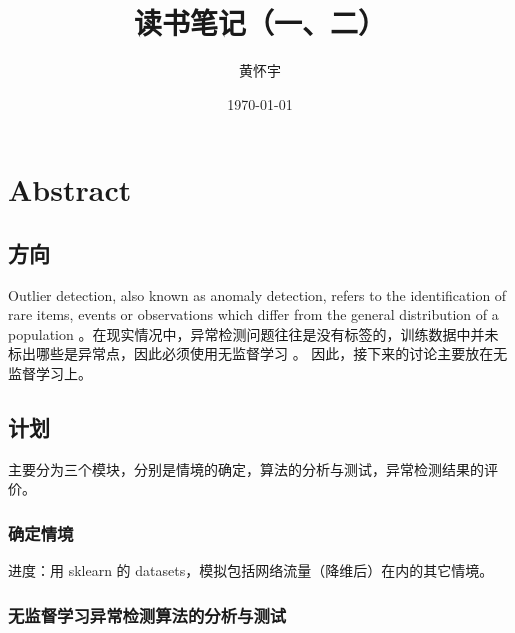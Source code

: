 \documentclass[UTF8]{ctexart}
\title{读书笔记（一、二）}
\author{黄怀宇}
\date{\today}
\begin{document}
\maketitle

\section{Abstract}
    \subsection{方向}
        Outlier detection, also known as anomaly detection, refers to the identification of rare items, events or observations which differ from the general distribution of a population \cite{zhao2019pyod}。在现实情况中，异常检测问题往往是没有标签的，训练数据中并未标出哪些是异常点，因此必须使用无监督学习 \cite{link1}。 因此，接下来的讨论主要放在无监督学习上。%
    \subsection{计划}
        主要分为三个模块，分别是情境的确定，算法的分析与测试，异常检测结果的评价。
        \subsubsection{确定情境}
            进度：用 sklearn 的 datasets，模拟包括网络流量（降维后）在内的其它情境。
            

        \subsubsection{无监督学习异常检测算法的分析与测试} 
\end{document}
